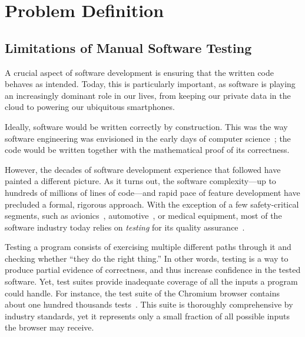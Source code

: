 \section{Problem Definition}

\subsection{Limitations of Manual Software Testing}

A crucial aspect of software development is ensuring that the written code behaves as intended.  Today, this is particularly important, as software is playing an increasingly dominant role in our lives, from keeping our private data in the cloud to powering our ubiquitous smartphones.

Ideally, software would be written correctly by construction.  This was the way software engineering was envisioned in the early days of computer science~\cite{dijkstra1976discipline}; the code would be written together with the mathematical proof of its correctness.

However, the decades of software development experience that followed have painted a different picture.  As it turns out, the software complexity---up to hundreds of millions of lines of code---and rapid pace of feature development have precluded a formal, rigorous approach.
%
With the exception of a few safety-critical segments, such as avionics~\cite{Astree}, automotive~\cite{automotive}, or medical equipment, most of the software industry today relies on \emph{testing} for its quality assurance~\cite{softwareMetrics}.




Testing a program consists of exercising multiple different paths through it and checking whether ``they do the right thing.''
%
In other words, testing is a way to produce partial evidence of correctness, and thus increase confidence in the tested software.
%
Yet, test suites provide inadequate coverage of all the inputs a program could handle.
%
For instance, the test suite of the Chromium browser contains about one hundred thousands tests~\cite{chrome-tests}.  This suite is thoroughly comprehensive by industry standards, yet it represents only a small fraction of all possible inputs the browser may receive.

